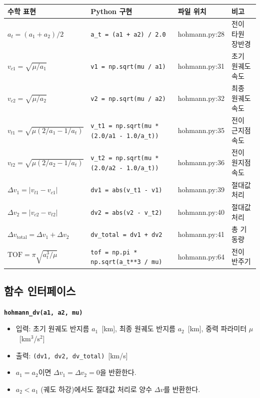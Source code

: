 \documentclass[11pt]{article}
\begin{document}
\begin{table}[htbp]
\centering
\small
\begin{tabular}{@{}llll@{}}
\toprule
수학 표현 & Python 구현 & 파일 위치 & 비고 \\
\midrule
$a_t = (a_1 + a_2)/2$ & \texttt{a\_t = (a1 + a2) / 2.0} & hohmann.py:28 & 전이 타원 장반경 \\
$v_{c1} = \sqrt{\mu/a_1}$ & \texttt{v1 = np.sqrt(mu / a1)} & hohmann.py:31 & 초기 원궤도 속도 \\
$v_{c2} = \sqrt{\mu/a_2}$ & \texttt{v2 = np.sqrt(mu / a2)} & hohmann.py:32 & 최종 원궤도 속도 \\
$v_{t1} = \sqrt{\mu(2/a_1 - 1/a_t)}$ & \texttt{v\_t1 = np.sqrt(mu * (2.0/a1 - 1.0/a\_t))} & hohmann.py:35 & 전이 근지점 속도 \\
$v_{t2} = \sqrt{\mu(2/a_2 - 1/a_t)}$ & \texttt{v\_t2 = np.sqrt(mu * (2.0/a2 - 1.0/a\_t))} & hohmann.py:36 & 전이 원지점 속도 \\
$\Delta v_1 = |v_{t1} - v_{c1}|$ & \texttt{dv1 = abs(v\_t1 - v1)} & hohmann.py:39 & 절대값 처리 \\
$\Delta v_2 = |v_{c2} - v_{t2}|$ & \texttt{dv2 = abs(v2 - v\_t2)} & hohmann.py:40 & 절대값 처리 \\
$\Delta v_{\text{total}} = \Delta v_1 + \Delta v_2$ & \texttt{dv\_total = dv1 + dv2} & hohmann.py:41 & 총 기동량 \\
$\text{TOF} = \pi\sqrt{a_t^3/\mu}$ & \texttt{tof = np.pi * np.sqrt(a\_t**3 / mu)} & hohmann.py:64 & 전이 반주기 \\
\bottomrule
\end{tabular}
\end{table}

\subsection{함수 인터페이스}

\textbf{\texttt{hohmann\_dv(a1, a2, mu)}}

\begin{itemize}[nosep]
\item 입력: 초기 원궤도 반지름 $a_1$~[km], 최종 원궤도 반지름 $a_2$~[km], 중력 파라미터 $\mu$~[km$^3$/s$^2$]
\item 출력: \texttt{(dv1, dv2, dv\_total)}~[km/s]
\item $a_1 = a_2$이면 $\Delta v_1 = \Delta v_2 = 0$을 반환한다.
\item $a_2 < a_1$ (궤도 하강)에서도 절대값 처리로 양수 $\Delta v$를 반환한다.
\end{itemize}
\end{document}
